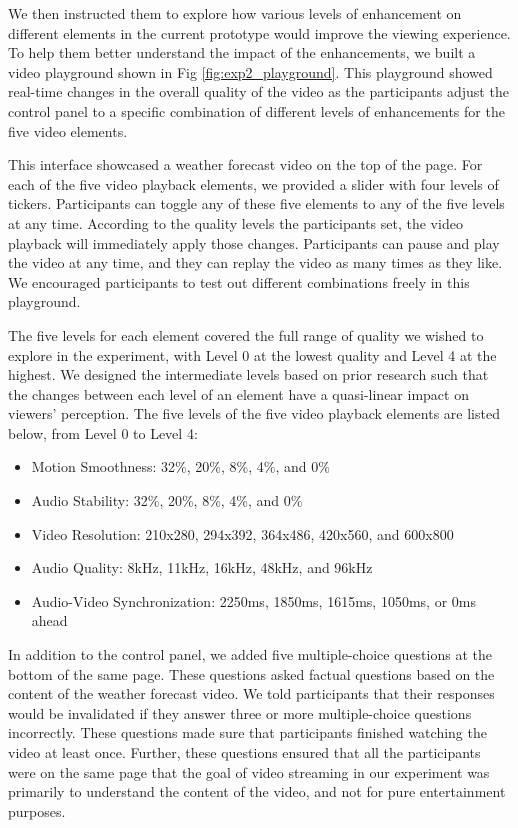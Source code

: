 We then instructed them to explore how various levels of enhancement on different elements in the current prototype would improve the viewing experience. To help them better understand the impact of the enhancements, we built a video playground shown in Fig \ref{fig:exp2_playground}. This playground showed real-time changes in the overall quality of the video as the participants adjust the control panel to a specific combination of different levels of enhancements for the five video elements.

This interface showcased a weather forecast video on the top of the page. For each of the five video playback elements, we provided a slider with four levels of tickers. Participants can toggle any of these five elements to any of the five levels at any time. According to the quality levels the participants set, the video playback will immediately apply those changes. Participants can pause and play the video at any time, and they can replay the video as many times as they like. We encouraged participants to test out different combinations freely in this playground.

The five levels for each element covered the full range of quality we wished to explore in the experiment, with Level 0 at the lowest quality and Level 4 at the highest. We designed the intermediate levels based on prior research \cite{claypool1999effects,oeldorf2012bad, noll1993wideband,knoche2008low, steinmetz1996human} such that the changes between each level of an element have a quasi-linear impact on viewers' perception. The five levels of the five video playback elements are listed below, from Level 0 to Level 4:
\begin{itemize}
    \item Motion Smoothness: 32\%, 20\%, 8\%, 4\%, and 0\%
    \item Audio Stability: 32\%, 20\%, 8\%, 4\%, and 0\%
    \item Video Resolution: 210x280, 294x392, 364x486, 420x560, and 600x800 
    \item Audio Quality: 8kHz, 11kHz, 16kHz, 48kHz, and 96kHz
    \item Audio-Video Synchronization: 2250ms, 1850ms,  1615ms, 1050ms, or 0ms ahead
\end{itemize}

In addition to the control panel, we added five multiple-choice questions at the bottom of the same page. These questions asked factual questions based on the content of the weather forecast video. We told participants that their responses would be invalidated if they answer three or more multiple-choice questions incorrectly. These questions made sure that participants finished watching the video at least once. Further, these questions ensured that all the participants were on the same page that the goal of video streaming in our experiment was primarily to understand the content of the video, and not for pure entertainment purposes.

